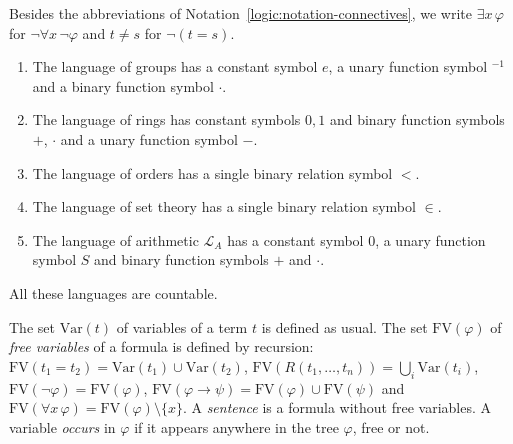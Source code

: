 \begin{notation}\label{logic:notation-quantifiers}
Besides the abbreviations of Notation~\ref{logic:notation-connectives}, we
write $\exists x\, \varphi$ for $\neg\forall x\, \neg\varphi$ and
$t \neq s$ for $\neg(t = s)$.
\end{notation}

\begin{example}\label{logic:example-languages}
\begin{enumerate}
\item The language of groups has a constant symbol $e$, a unary function
symbol ${}^{-1}$ and a binary function symbol $\cdot$.
\item The language of rings has constant symbols $0, 1$ and binary function
symbols $+$, $\cdot$ and a unary function symbol $-$.
\item The language of orders has a single binary relation symbol $<$.
\item The language of set theory has a single binary relation symbol $\in$.
\item The language of arithmetic $\mathcal{L}_A$ has a constant symbol $0$, a
unary function symbol $S$ and binary function symbols $+$ and $\cdot$.
\end{enumerate}
All these languages are countable.
\end{example}

\begin{definition}\label{logic:definition-free-variables}
The set $\mathrm{Var}(t)$ of variables of a term $t$ is defined as usual. The
set $\mathrm{FV}(\varphi)$ of \emph{free variables} of a formula is defined by
recursion: $\mathrm{FV}(t_1 = t_2) = \mathrm{Var}(t_1) \cup \mathrm{Var}(t_2)$,
$\mathrm{FV}(R(t_1, \ldots, t_n)) = \bigcup_i \mathrm{Var}(t_i)$,
$\mathrm{FV}(\neg\varphi) = \mathrm{FV}(\varphi)$,
$\mathrm{FV}(\varphi \to \psi) = \mathrm{FV}(\varphi) \cup \mathrm{FV}(\psi)$ and
$\mathrm{FV}(\forall x\,\varphi) = \mathrm{FV}(\varphi) \setminus \{x\}$. A
\emph{sentence} is a formula without free variables. A variable \emph{occurs}
in $\varphi$ if it appears anywhere in the tree $\varphi$, free or not.
\end{definition}

